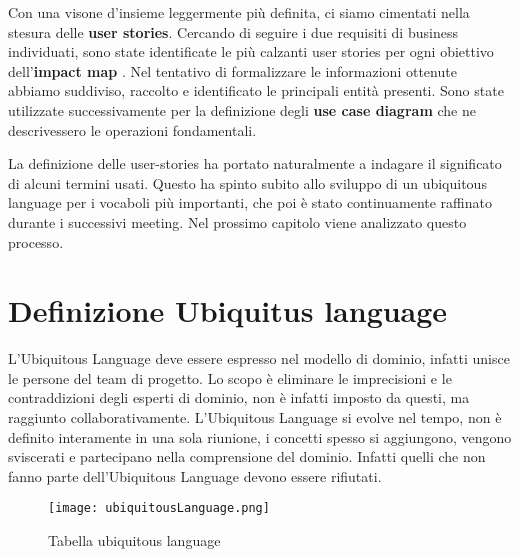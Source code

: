     Con una visone d'insieme leggermente più definita, ci siamo cimentati nella stesura delle \textbf{user stories}. Cercando di seguire i due requisiti di business individuati, sono state identificate le più calzanti user stories per ogni obiettivo  dell'\textbf{impact map}
    .
    Nel tentativo di formalizzare le informazioni ottenute abbiamo suddiviso, raccolto e identificato le principali entità presenti. Sono state utilizzate successivamente per la definizione degli \textbf{use case diagram} che ne descrivessero le operazioni fondamentali.

	La definizione delle user-stories ha portato naturalmente a indagare il significato di alcuni termini usati. Questo ha spinto subito allo sviluppo di un ubiquitous language per i vocaboli più importanti, che poi è stato continuamente raffinato durante i successivi meeting. 
	Nel prossimo capitolo viene analizzato questo processo. 
    
	\section{Definizione Ubiquitus language}	
	L'Ubiquitous Language deve essere espresso nel modello di dominio, infatti unisce le persone del team di progetto.
    Lo scopo è eliminare le imprecisioni e le contraddizioni degli esperti di dominio, non è infatti imposto da questi, ma raggiunto collaborativamente.
    L'Ubiquitous Language si evolve nel tempo, non è definito interamente in una sola riunione, i concetti spesso si aggiungono, vengono sviscerati e partecipano nella comprensione del dominio. Infatti quelli che non fanno parte dell'Ubiquitous Language devono essere rifiutati.
    
    \begin{figure}[ht]
        \caption{Tabella ubiquitous language}
        \centering
        \texttt{[image: ubiquitousLanguage.png]}
    \end{figure}
